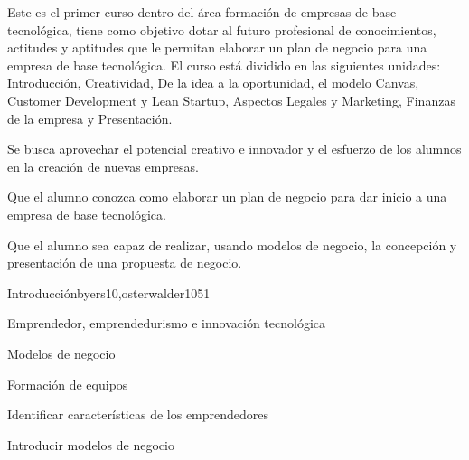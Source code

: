 \begin{syllabus}


\begin{justification}
Este es el primer curso dentro del área formación de empresas de
base tecnológica, tiene como objetivo dotar al futuro profesional 
de conocimientos, actitudes y aptitudes que le
permitan elaborar un plan de negocio para una empresa de base tecnológica.
El curso está dividido en las siguientes unidades:
Introducción, Creatividad, De la idea a la oportunidad, el modelo Canvas, Customer Development y Lean Startup, Aspectos Legales y Marketing, Finanzas de la empresa y Presentación.

Se busca aprovechar el potencial creativo e innovador y el esfuerzo de los alumnos en la creación de nuevas empresas.
\end{justification}

\begin{goals}
\item Que el alumno conozca como elaborar un plan de negocio para dar inicio a una empresa de base tecnológica.
\item Que el alumno sea capaz de realizar, usando modelos de negocio, la concepción y presentación de una propuesta de negocio.
\end{goals}

\begin{outcomes}
\end{outcomes}

\begin{unit}{Introducción}{byers10,osterwalder10}{5}{1}
\begin{topics}
      \item Emprendedor, emprendedurismo e innovación tecnológica
      \item Modelos de negocio
      \item Formación de equipos
   \end{topics}

   \begin{unitgoals}
      \item Identificar características de los emprendedores
      \item Introducir modelos de negocio 
   \end{unitgoals}
\end{unit}


\end{syllabus}
